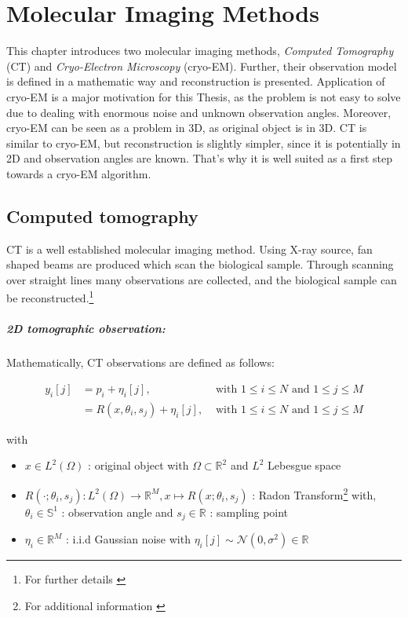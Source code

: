 \chapter{Molecular Imaging Methods}
\label{sec:imaging}

This chapter introduces two molecular imaging methods, \textit{Computed Tomography} (CT) and 
\textit{Cryo-Electron Microscopy} (cryo-EM). 
Further, their observation model is defined in a mathematic way and reconstruction is presented.
Application of cryo-EM is a major motivation for this Thesis, 
as the problem is not easy to solve due to dealing with enormous noise and unknown observation angles.
Moreover, cryo-EM can be seen as a problem in 3D, as original object is in 3D.
CT is similar to cryo-EM, but reconstruction is slightly simpler, since it is potentially in 2D and 
observation angles are known.
That's why it is well suited as a first step towards a cryo-EM algorithm.



\section{Computed tomography}
CT is a well established molecular imaging method.
Using X-ray source, fan shaped beams are produced which scan the biological sample.
Through scanning over straight lines many observations are collected, 
and the biological sample can be reconstructed.\footnote{For further details \cite{computedTomography}}

\paragraph{2D tomographic observation:}

Mathematically, CT observations are defined as follows:

\begin{equation}
    \label{eq:2Dreconstruction}
    \begin{aligned}
        y_i[j] &= p_i + \eta_i[j], & \text{ with } 1 \leq i \leq N \text{ and } 1 \leq j \leq M \\
               &= R(x, \theta_i, s_j) + \eta_i[j], & \text{ with } 1 \leq i \leq N \text{ and } 1 \leq j \leq M
    \end{aligned}
\end{equation}

with
\begin{itemize}
    \item $x \in L^2(\Omega)$ : original object with $\Omega \subset \mathbb{R}^2 $ and $L^2$ Lebesgue space
    \item $R(\cdot; \theta_i, s_j): L^2(\Omega) \to \mathbb{R}^M , x \mapsto R(x; \theta_i, s_j)$ : Radon Transform\footnote{For additional information \cite{radonTransform}} 
        with, $\theta_i \in \mathbb{S}^1$ : observation angle and $s_j \in \mathbb{R}$ : sampling point
    \item $\eta_i \in \mathbb{R}^M$ : i.i.d Gaussian noise with $\eta_i[j] \sim \mathcal{N}(0,\sigma^2) \in \mathbb{R}$
\end{itemize}


